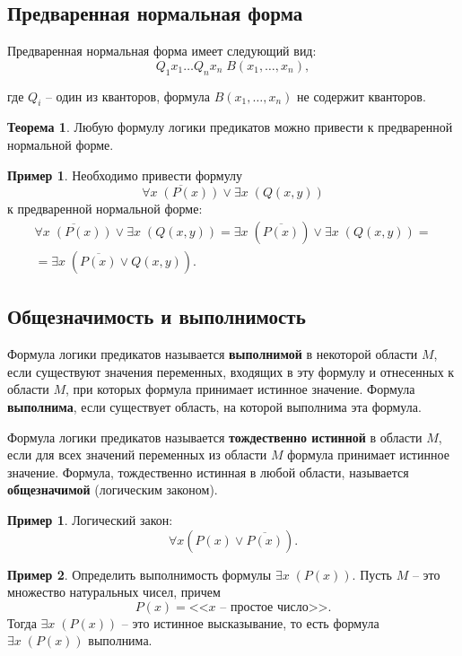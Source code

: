 \documentclass[a5paper, 11pt]{extarticle}
\theoremstyle{definition}
\newtheorem*{theorem*}{Теорема}
\newtheorem{example}{Пример}[subsection]
\newtheorem*{example*}{Пример}
\theoremstyle{definition}
\theoremstyle{definition}
\numberwithin{figure}{section}
\numberwithin{table}{section}
\begin{document}
\subsection{Предваренная нормальная форма}

Предваренная нормальная форма имеет следующий вид:
\[
    Q_1 x_1 \ldots Q_n x_n \; B(x_1, \ldots, x_n),
\]

где \(Q_i\) -- один из кванторов, формула \(B(x_1, \ldots, x_n)\) не содержит кванторов.

\begin{theorem*}
    Любую формулу логики предикатов можно привести к предваренной нормальной форме.
\end{theorem*}

\begin{example*}
    Необходимо привести формулу
    \[
        \overline{\forall x \; (P(x))} \lor \exists x \; (Q(x, y))
    \]
    к предваренной нормальной форме:
    \begin{gather*}
        \overline{\forall x \; (P(x))} \lor \exists x \; (Q(x, y)) =
        \exists x \; (\overline{P(x)}) \lor \exists x \; (Q(x, y)) = \\=
        \exists x \; (\overline{P(x)} \lor Q(x, y)).
    \end{gather*}
\end{example*}

\subsection{Общезначимость и выполнимость}

Формула логики предикатов называется \textbf{выполнимой} в некоторой области \(M\), если существуют значения переменных, входящих в эту формулу и отнесенных к области \(M\), при которых формула принимает истинное значение. Формула \textbf{выполнима}, если существует область, на которой выполнима эта формула.

Формула логики предикатов называется \textbf{тождественно истинной} в области \(M\), если для всех значений переменных из области \(M\) формула принимает истинное значение. Формула, тождественно истинная в любой области, называется \textbf{общезначимой} (логическим законом).

\begin{example}
    Логический закон:
    \[
        \forall x (P(x) \lor \overline{P(x)}).
    \]
\end{example}

\begin{example}
    Определить выполнимость формулы \(\exists x \; (P(x))\). Пусть \(M\) -- это множество натуральных чисел, причем
    \[
        P(x) = \text{<<\(x\) -- простое число>>}.
    \]
    Тогда \(\exists x \; (P(x))\) -- это истинное высказывание, то есть формула \(\exists x \; (P(x))\) выполнима.
\end{example}
\end{document}
